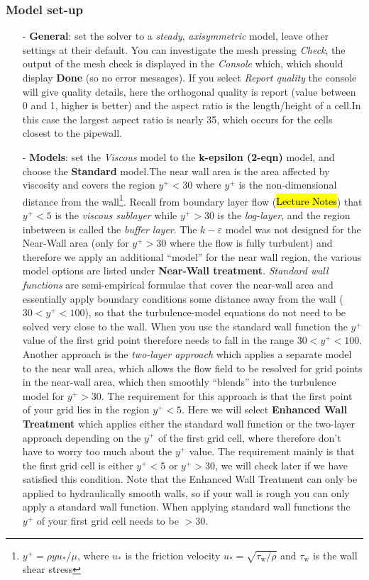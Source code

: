 \documentclass[11pt,a4paper,oneside]{scrartcl}
\newcommand\bfr[1]{\textcolor[rgb]{1,0.00,0.00}{\textbf{\textsf{#1}}}}
\begin{document}
\subsubsection*{Model set-up}


\begin{itemize}
    \item[-] \textbf{General}: set the solver to a \emph{steady}, \emph{axisymmetric} model, leave other settings at their default. You can investigate the mesh pressing \emph{Check}, the output of the mesh check is displayed in the \emph{Console} which, which should display \bfr{Done} (so no error messages). If you select \emph{Report quality} the console will give quality details, here the orthogonal quality is report (value between 0 and 1, higher is better) and the aspect ratio is the length/height of a cell.In this case the largest aspect ratio is nearly 35, which occurs for the cells closest to the pipewall.
    \item[-] \textbf{Models}: set the \emph{Viscous} model to the \bfr{k-epsilon (2-eqn)} model, and choose the \bfr{Standard} model.The near wall area is the area affected by viscosity and covers the region $y^+<30$ where $y^+$ is the non-dimensional distance from the wall\footnote{$y^+=\rho yu_{*}/\mu$, where $u_{*}$ is the friction velocity $u_{*}=\sqrt{\tau_\mathrm{w}/\rho}$ and $\tau_\mathrm{w}$ is the wall shear stress}. Recall from boundary layer flow (\hl{Lecture Notes}) that $y^+<5$ is the \emph{viscous sublayer} while $y^+>30$ is the \emph{log-layer}, and the region inbetween is called the \emph{buffer layer}. The $k-\varepsilon$ model was not designed for the Near-Wall area (only for $y^+>30$ where the flow is fully turbulent) and
        therefore we apply an additional ``model'' for the near wall region, the various model options are listed under \bfr{Near-Wall treatment}.
        \emph{Standard wall functions} are semi-empirical formulae that cover the near-wall area and essentially apply boundary
        conditions some distance away from the wall ($30 < y^+ < 100$), so that the turbulence-model equations do not need to be
        solved very close to the wall. When you use the standard wall function the $y^+$ value of the first grid point therefore needs to
        fall in the range $30 < y^+ < 100$. Another approach is the \emph{two-layer approach} which applies a separate model to the
        near wall area, which allows the flow field to be resolved for grid points in the near-wall area, which then smoothly
        ``blends'' into the turbulence model for $y^+>30$. The requirement for this approach is that the first point of your grid lies in the region $y^+<5$. Here we will select \bfr{Enhanced Wall Treatment} which applies either the standard wall function  or the two-layer approach depending on the $y^+$ of the first grid cell, where therefore don't have to worry too much about the $y^+$ value. The requirement mainly is that the first grid cell is either $y^+<5$ or $y^+>30$, we will check later if we have satisfied this condition. Note that the Enhanced Wall Treatment can only be applied to hydraulically smooth walls, so if your wall is rough you can only apply a standard wall function. When applying standard wall functions the $y^+$ of your first grid cell needs to be $>30$.

\end{itemize}
\end{document}
